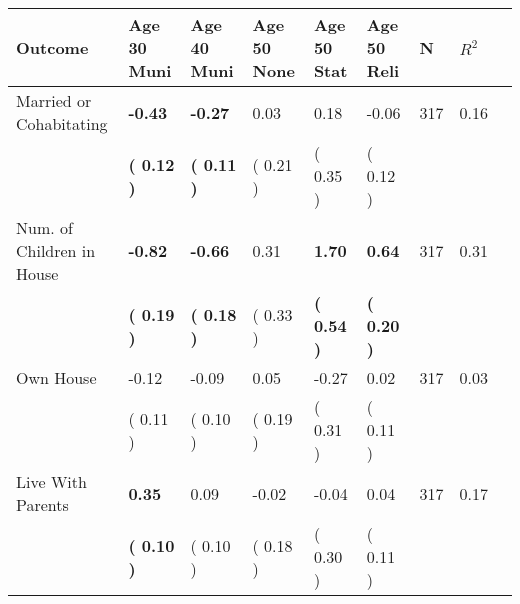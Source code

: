 \begin{tabular}{L{6.2cm} C{1.8cm} C{1.8cm} C{1.8cm} C{1.8cm} C{1.8cm} C{1.8cm} C{0.3cm} C{0.3cm}}
\toprule
 \textbf{Outcome} & \textbf{Age 30 Muni} & \textbf{Age 40 Muni} & \textbf{Age 50 None} & \textbf{Age 50 Stat} & \textbf{Age 50 Reli} & \textbf{N} & \textbf{$ R^2$} \\
\midrule
Married or Cohabitating & \textbf{    -0.43} & \textbf{    -0.27} &      0.03 &      0.18 &     -0.06  & 317 &       0.16 \\ 
 & \textbf{(     0.12 )} & \textbf{(     0.11 )} & (     0.21 ) & (     0.35 ) & (     0.12 )  & \\
Num. of Children in House & \textbf{    -0.82} & \textbf{    -0.66} &      0.31 & \textbf{     1.70} & \textbf{     0.64}  & 317 &       0.31 \\ 
 & \textbf{(     0.19 )} & \textbf{(     0.18 )} & (     0.33 ) & \textbf{(     0.54 )} & \textbf{(     0.20 )}  & \\
Own House &     -0.12 &     -0.09 &      0.05 &     -0.27 &      0.02  & 317 &       0.03 \\ 
 & (     0.11 ) & (     0.10 ) & (     0.19 ) & (     0.31 ) & (     0.11 )  & \\
Live With Parents & \textbf{     0.35} &      0.09 &     -0.02 &     -0.04 &      0.04  & 317 &       0.17 \\ 
 & \textbf{(     0.10 )} & (     0.10 ) & (     0.18 ) & (     0.30 ) & (     0.11 )  & \\
\bottomrule
\end{tabular}
